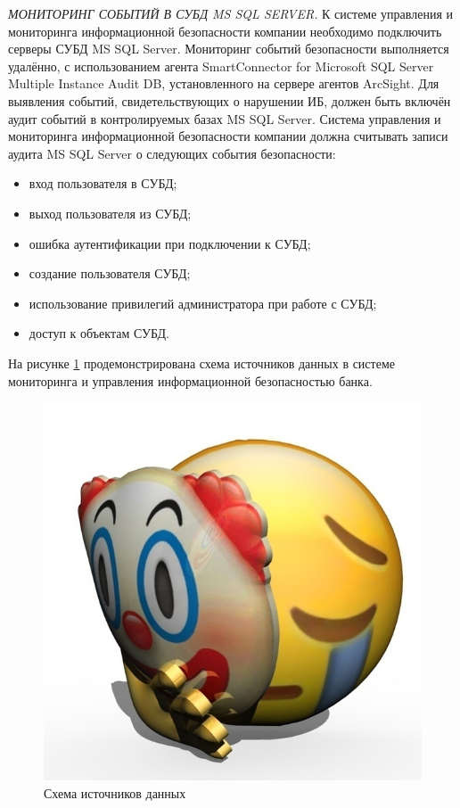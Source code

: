 \textit{МОНИТОРИНГ СОБЫТИЙ В СУБД MS SQL SERVER.}
К системе управления и мониторинга информационной безопасности компании необходимо подключить серверы СУБД MS SQL Server. Мониторинг событий безопасности выполняется удалённо, с использованием агента SmartConnector for Microsoft SQL Server Multiple Instance Audit DB, установленного на сервере агентов ArcSight.
Для выявления событий, свидетельствующих о нарушении ИБ, должен быть включён аудит событий в контролируемых базах MS SQL Server. Система управления и мониторинга информационной безопасности компании должна считывать записи аудита MS SQL Server о следующих события безопасности:
\begin{itemize}
    \item вход пользователя в СУБД;
    \item выход пользователя из СУБД;
    \item ошибка аутентификации при подключении к СУБД;
    \item создание пользователя СУБД;
    \item использование привилегий администратора при работе с СУБД;
    \item доступ к объектам СУБД.
\end{itemize}

На рисунке \ref{source} продемонстрирована схема источников данных в системе мониторинга и управления информационной безопасностью банка.
\begin{landscape}
\begin{figure}[H]
  \centering
  \includegraphics[width=1.3\textwidth]{resources/4.jpg}
  \caption{Схема источников данных}
  \label{source}
\end{figure}
\end{landscape}

